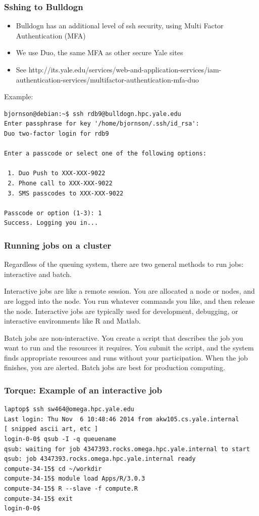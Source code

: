 \documentclass[10pt]{beamer}
\begin{document}
\begin{frame}[fragile]
\frametitle{Sshing to Bulldogn}

\begin{itemize}
\item Bulldogn has an additional level of ssh security, using Multi Factor Authentication (MFA)
\item We use Duo, the same MFA as other secure Yale sites
\item See http://its.yale.edu/services/web-and-application-services/iam-authentication-services/multifactor-authentication-mfa-duo
\end{itemize}

Example:
\begin{verbatim}
bjornson@debian:~$ ssh rdb9@bulldogn.hpc.yale.edu
Enter passphrase for key '/home/bjornson/.ssh/id_rsa': 
Duo two-factor login for rdb9

Enter a passcode or select one of the following options:

 1. Duo Push to XXX-XXX-9022
 2. Phone call to XXX-XXX-9022
 3. SMS passcodes to XXX-XXX-9022

Passcode or option (1-3): 1
Success. Logging you in...
\end{verbatim}  
\end{frame}
\begin{frame}[fragile]
\frametitle{Running jobs on a cluster}

Regardless of the queuing system, there are two general methods to run jobs: interactive and batch.

\vskip10pt
Interactive jobs are like a remote session.  You are allocated a node or nodes, and are logged into the node.  You
run whatever commands you like, and then release the node.  Interactive jobs are typically used for development, debugging, or 
interactive environments like R and Matlab. 

\vskip10pt
Batch jobs are non-interactive.  You create a script that describes the job you want to run and 
the resources it requires.  You submit the script, and the system finds appropriate resources and runs without
your participation.  When the job finishes, you are alerted.  Batch jobs are best for production computing.

\end{frame}

\begin{frame}[fragile]
\frametitle{Torque: Example of an interactive job}
\begin{verbatim}
laptop$ ssh sw464@omega.hpc.yale.edu
Last login: Thu Nov  6 10:48:46 2014 from akw105.cs.yale.internal
[ snipped ascii art, etc ]
login-0-0$ qsub -I -q queuename
qsub: waiting for job 4347393.rocks.omega.hpc.yale.internal to start
qsub: job 4347393.rocks.omega.hpc.yale.internal ready
compute-34-15$ cd ~/workdir
compute-34-15$ module load Apps/R/3.0.3
compute-34-15$ R --slave -f compute.R
compute-34-15$ exit 
login-0-0$ 
\end{verbatim}
\end{frame}
\end{document}
